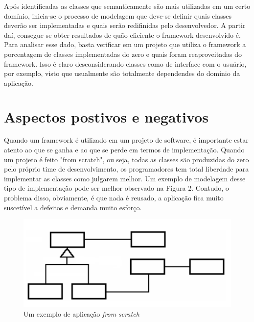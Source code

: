\documentclass[
    12pt,       %
    openright,      %
    twoside,      %
    a4paper,      %
    english,      %
    french,       %
    spanish,      %
    brazil,       %
    ]{abntex2}
\begin{document}
          Após identificadas as classes que semanticamente são mais utilizadas em um
          certo domínio, inicia-se o processo de modelagem
          que deve-se definir quais classes deverão ser implementadas e quais serão
          redifinidas pelo desenvolvedor. A partir daí, consegue-se obter resultados
          de quão eficiente o framework desenvolvido é. Para analisar esse dado,
          basta verificar em um projeto que utiliza o framework a porcentagem
          de classes implementadas do zero e quais foram reaproveitadas do framework.
          Isso é claro desconsiderando classes como de interface com o usuário, por
          exemplo, visto que usualmente são totalmente dependendes do domínio da aplicação.

      \section{Aspectos postivos e negativos}
          Quando um framework é utilizado em um projeto de software, é importante estar
          atento ao que se ganha e ao que se perde em termos de implementação. Quando
          um projeto é feito "from scratch", ou seja, todas as classes são produzidas do
          zero pelo próprio time de desenvolvimento, os programadores tem total liberdade
          para implementar as classes como julgarem melhor. Um exemplo de modelagem desse
          tipo de implementação pode ser melhor observado na Figura 2. Contudo, o problema
          disso, obviamente, é que nada é reusado, a aplicação fica muito suscetível a
          defeitos e demanda muito esforço.

          \begin{figure}[htbp]
              \begin{center}
                  \includegraphics[width=1.0\textwidth]{img/scratch.png}
              \end{center}
              \caption{\label{fig:passaro}Um exemplo de aplicação \textit{from scratch}}
          \end{figure}
\end{document}
